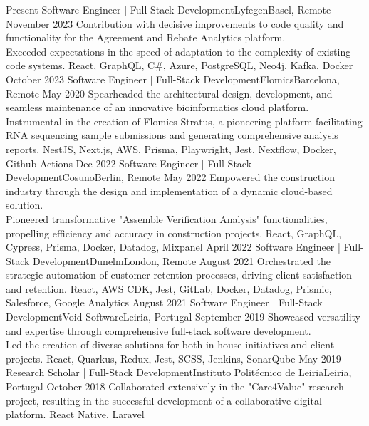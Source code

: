 %
%
%
\vspace{0.5em}
\begin{experiences}
  \experience
  {Present} {Software Engineer | Full-Stack Development}{Lyfegen}{Basel, Remote}
  {November 2023}    {Contribution with decisive improvements to code quality and functionality for the Agreement and Rebate Analytics platform.\\
  Exceeded expectations in the speed of adaptation to the complexity of existing code systems.}
  {React, GraphQL, C\#, Azure, PostgreSQL, Neo4j, Kafka, Docker} 
  \emptySeparator
  \experience
  {October 2023} {Software Engineer | Full-Stack Development}{Flomics}{Barcelona, Remote}
  {May 2020}    {Spearheaded the architectural design, development, and seamless maintenance of an 
  innovative bioinformatics cloud platform.\\
  Instrumental in the creation of Flomics Stratus, a pioneering platform facilitating RNA sequencing 
  sample submissions and generating comprehensive analysis reports.}
  {NestJS, Next.js, AWS, Prisma, Playwright, Jest, Nextflow, Docker, Github Actions}
  \emptySeparator
  \experience
  {Dec 2022} {Software Engineer | Full-Stack Development}{Cosuno}{Berlin, Remote}
  {May 2022} {Empowered the construction industry through the design and implementation of a dynamic cloud-based 
  solution.
  \\Pioneered transformative "Assemble Verification Analysis" functionalities, propelling efficiency 
  and accuracy in construction projects.}
  {React, GraphQL, Cypress, Prisma, Docker, Datadog, Mixpanel}
  \emptySeparator
  \experience
  {April 2022}   {Software Engineer | Full-Stack Development}{Dunelm}{London, Remote}
  {August 2021} {Orchestrated the strategic automation of customer retention processes, driving 
  client satisfaction and retention.}
  {React,  AWS CDK, Jest, GitLab, Docker, Datadog, Prismic, Salesforce, Google Analytics}
  \emptySeparator
  \experience
  {August 2021}     {Software Engineer | Full-Stack Development}{Void Software}{Leiria, Portugal}
  {September 2019}    {Showcased versatility and expertise through comprehensive full-stack software development.\\
  Led the creation of diverse solutions for both in-house initiatives and client projects.}
  {React, Quarkus, Redux, Jest, SCSS, Jenkins, SonarQube}
  \emptySeparator
  \experience
  {May 2019}     {Research Scholar | Full-Stack Development}{Instituto Politécnico de Leiria}{Leiria, Portugal}
  {October 2018}    {Collaborated extensively in the "Care4Value" research project, 
  resulting in the successful development of a collaborative digital platform.}
  {React Native, Laravel}
\end{experiences}